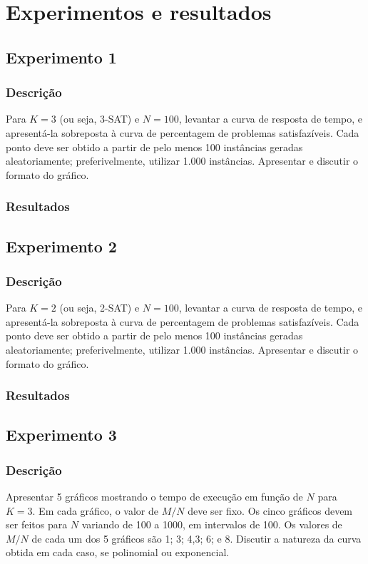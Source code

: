 \section{Experimentos e resultados} 
 
\subsection{Experimento 1} 
	\subsubsection{Descrição}
		Para $K = 3$ (ou seja, 3-SAT) e $N = 100$, levantar a curva de resposta de tempo, e apresentá-la sobreposta à curva de percentagem de problemas satisfazíveis. Cada ponto deve ser obtido a partir de pelo menos 100 instâncias geradas aleatoriamente; preferivelmente, utilizar 1.000 instâncias. Apresentar e discutir o formato do gráfico.
	\subsubsection{Resultados}
	
 \subsection{Experimento 2} 
	\subsubsection{Descrição}
		Para $K = 2$ (ou seja, 2-SAT) e $N = 100$, levantar a curva de resposta de tempo, e apresentá-la sobreposta à curva de percentagem de problemas satisfazíveis. Cada ponto deve ser obtido a partir de pelo menos 100 instâncias geradas aleatoriamente; preferivelmente, utilizar 1.000 instâncias. Apresentar e discutir o formato do gráfico.
	\subsubsection{Resultados}

\subsection{Experimento 3} 
	\subsubsection{Descrição}
		Apresentar 5 gráficos mostrando o tempo de execução em função de $N$ para $K = 3$. Em cada gráfico, o valor de $M / N$ deve ser fixo. Os cinco gráficos devem ser feitos para $N$ variando de 100 a 1000, em intervalos de 100. Os valores de $M / N$ de cada um dos 5 gráficos são 1; 3; 4,3; 6; e 8. Discutir a natureza da curva obtida em cada caso, se polinomial ou exponencial.
